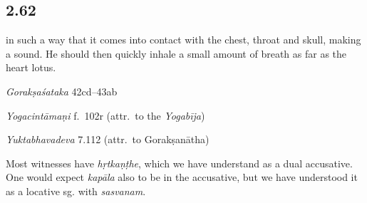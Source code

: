 \begin{ekdosis}

\subsection*{2.62}
\begin{translation}[hp02_062]
in such a way that it comes into contact with the chest, throat and skull, making a sound. He should then quickly inhale a small amount of breath as far as the heart lotus.
\end{translation}

\begin{sources}[hp02_062]
\emph{Gorakṣaśataka} 42cd–43ab

\begin{versinnote}
\end{versinnote}
\end{sources}

\begin{testimonia}[hp02_062]
\emph{Yogacintāmaṇi} f.~102r (attr.~to the \emph{Yogabīja})

\begin{versinnote}
\end{versinnote}

\emph{Yuktabhavadeva} 7.112 (attr.~to Gorakṣanātha)

\begin{versinnote}
\end{versinnote}
\end{testimonia}

\begin{philcomm}[hp02_062]

Most witnesses have \emph{hṛtkaṇṭhe}, which we have understand as a dual accusative. One would expect \emph{kapāla} also to be in the accusative, but we have understood it as a locative sg. with \emph{sasvanam}.
\end{philcomm}


\end{ekdosis}
